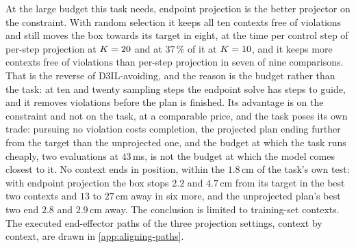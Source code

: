 At the large budget this task needs, endpoint projection is the better projector on the constraint. With
random selection it keeps all ten contexts free of violations and still moves the box towards its target in
eight, at the time per control step of per-step projection at $K=20$ and at $37\,\%$ of it at $K=10$, and
it keeps more contexts free of violations than per-step projection in seven of nine comparisons. That is the reverse of D3IL-avoiding,
and the reason is the budget rather than the task: at ten and twenty sampling steps the endpoint solve has steps
to guide, and it removes violations before the plan is finished. Its advantage is on the constraint and not on
the task, at a comparable price, and the task poses its own trade: pursuing no violation costs completion, the
projected plan ending further from the target than the unprojected one, and the budget at which the task runs
cheaply, two evaluations at $43$\,ms, is not the budget at which the model comes closest to it. No context ends
in position, within the $1.8$\,cm of the task's own test: with endpoint projection the box stops $2.2$ and
$4.7$\,cm from its target in the best two contexts and $13$ to $27$\,cm away in six more, and the unprojected plan's
best two end $2.8$ and $2.9$\,cm away. The conclusion is limited to training-set contexts. The executed end-effector paths of the three projection settings, context by
context, are drawn in \autoref{app:aligning-paths}.

